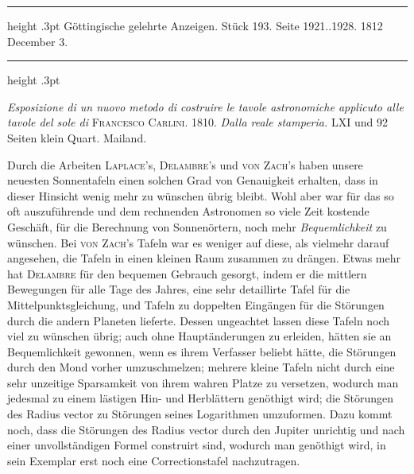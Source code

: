 \par\bigskip
\hypertarget{native-548-lower}{}\label{native-548-lower}
\begin{center}
\parbox{.88\linewidth}{%
\centering\small
\hrule height .3pt\relax\vspace{2.5pt}
Göttingische gelehrte Anzeigen. Stück 193. Seite 1921..1928. 1812 December 3.\par
\vspace{2.5pt}\hrule height .3pt\relax
}
\end{center}
\par\nobreak\medskip

\emph{Esposizione di un nuovo metodo di costruire le tavole astronomiche applicuto alle tavole del sole di} \textsc{Francesco Carlini}. 1810. \emph{Dalla reale stamperia.} LXI und 92 Seiten klein Quart. Mailand.

Durch die Arbeiten \textsc{Laplace}'s, \textsc{Delambre}'s und \textsc{von Zach}'s haben unsere neuesten Sonnentafeln einen solchen Grad von Genauigkeit erhalten, dass in dieser Hinsicht wenig mehr zu wünschen übrig bleibt. Wohl aber war für das so oft auszuführende und dem rechnenden Astronomen so viele Zeit kostende Geschäft, für die Berechnung von Sonnenörtern, noch mehr \emph{Bequemlichkeit} zu wünschen. Bei \textsc{von Zach}'s Tafeln war es weniger auf diese, als vielmehr darauf angesehen, die Tafeln in einen kleinen Raum zusammen zu drängen. Etwas mehr hat \textsc{Delambre} für den bequemen Gebrauch gesorgt, indem er die mittlern Bewegungen für alle Tage des Jahres, eine sehr detaillirte Tafel für die Mittelpunktsgleichung, und Tafeln zu doppelten Eingängen für die Störungen durch die andern Planeten lieferte. Dessen ungeachtet lassen diese Tafeln noch viel zu wünschen übrig; auch ohne Hauptänderungen zu erleiden, hätten sie an Bequemlichkeit gewonnen, wenn es ihrem Verfasser beliebt hätte, die Störungen durch den Mond vorher umzuschmelzen; mehrere kleine Tafeln nicht durch eine sehr unzeitige Sparsamkeit von ihrem wahren Platze zu versetzen, wodurch man jedesmal zu einem lästigen Hin- und Herblättern genöthigt wird; die Störungen des Radius vector zu Störungen seines Logarithmen umzuformen. Dazu kommt noch, dass die Störungen des Radius vector durch den Jupiter unrichtig und nach einer unvollständigen Formel construirt sind, wodurch man genöthigt wird, in sein Exemplar erst noch eine Correctionstafel nachzutragen.


